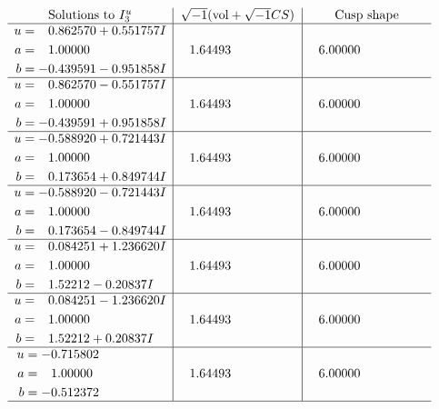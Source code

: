 \documentclass[1p]{elsarticle_modified}
\theoremstyle{definition}
\newcommand{\I}{\sqrt{-1}}
\begin{document}
$$\begin{array}{c|c|c}  
\text{Solutions to }I^u_{3}& \I (\text{vol} + \sqrt{-1}CS) & \text{Cusp shape}\\
 \hline 
\begin{aligned}
u &= \phantom{-}0.862570 + 0.551757 I \\
a &= \phantom{-}1.00000\phantom{ +0.000000I} \\
b &= -0.439591 - 0.951858 I\end{aligned}
 & \phantom{-}1.64493\phantom{ +0.000000I} & \phantom{-}6.00000\phantom{ +0.000000I} \\ \hline\begin{aligned}
u &= \phantom{-}0.862570 - 0.551757 I \\
a &= \phantom{-}1.00000\phantom{ +0.000000I} \\
b &= -0.439591 + 0.951858 I\end{aligned}
 & \phantom{-}1.64493\phantom{ +0.000000I} & \phantom{-}6.00000\phantom{ +0.000000I} \\ \hline\begin{aligned}
u &= -0.588920 + 0.721443 I \\
a &= \phantom{-}1.00000\phantom{ +0.000000I} \\
b &= \phantom{-}0.173654 + 0.849744 I\end{aligned}
 & \phantom{-}1.64493\phantom{ +0.000000I} & \phantom{-}6.00000\phantom{ +0.000000I} \\ \hline\begin{aligned}
u &= -0.588920 - 0.721443 I \\
a &= \phantom{-}1.00000\phantom{ +0.000000I} \\
b &= \phantom{-}0.173654 - 0.849744 I\end{aligned}
 & \phantom{-}1.64493\phantom{ +0.000000I} & \phantom{-}6.00000\phantom{ +0.000000I} \\ \hline\begin{aligned}
u &= \phantom{-}0.084251 + 1.236620 I \\
a &= \phantom{-}1.00000\phantom{ +0.000000I} \\
b &= \phantom{-}1.52212 - 0.20837 I\end{aligned}
 & \phantom{-}1.64493\phantom{ +0.000000I} & \phantom{-}6.00000\phantom{ +0.000000I} \\ \hline\begin{aligned}
u &= \phantom{-}0.084251 - 1.236620 I \\
a &= \phantom{-}1.00000\phantom{ +0.000000I} \\
b &= \phantom{-}1.52212 + 0.20837 I\end{aligned}
 & \phantom{-}1.64493\phantom{ +0.000000I} & \phantom{-}6.00000\phantom{ +0.000000I} \\ \hline\begin{aligned}
u &= -0.715802\phantom{ +0.000000I} \\
a &= \phantom{-}1.00000\phantom{ +0.000000I} \\
b &= -0.512372\phantom{ +0.000000I}\end{aligned}
 & \phantom{-}1.64493\phantom{ +0.000000I} & \phantom{-}6.00000\phantom{ +0.000000I}\\
 \hline 
 \end{array}$$\newpage
\end{document}
